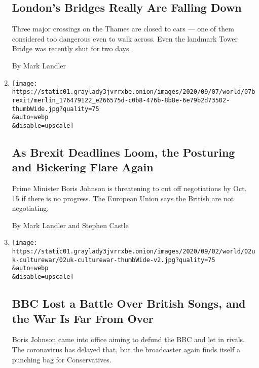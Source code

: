 \begin{enumerate}
  \hypertarget{londons-bridges-really-are-falling-down}{%
  \subsection{London's Bridges Really Are Falling
  Down}\label{londons-bridges-really-are-falling-down}}

  Three major crossings on the Thames are closed to cars --- one of them
  considered too dangerous even to walk across. Even the landmark Tower
  Bridge was recently shut for two days.

  By Mark Landler
\item
  \href{/2020/09/07/world/europe/brexit-boris-johnson.html}{}

  \texttt{[image: https://static01.graylady3jvrrxbe.onion/images/2020/09/07/world/07brexit/merlin\_176479122\_e266575d-c0b8-476b-8b8e-6e79b2d73502-thumbWide.jpg?quality=75\\\&auto=webp\\\&disable=upscale]}

  \hypertarget{as-brexit-deadlines-loom-the-posturing-and-bickering-flare-again}{%
  \subsection{As Brexit Deadlines Loom, the Posturing and Bickering
  Flare
  Again}\label{as-brexit-deadlines-loom-the-posturing-and-bickering-flare-again}}

  Prime Minister Boris Johnson is threatening to cut off negotiations by
  Oct. 15 if there is no progress. The European Union says the British
  are not negotiating.

  By Mark Landler and Stephen Castle
\item
  \href{/2020/09/02/world/europe/bbc-proms-johnson.html}{}

  \texttt{[image: https://static01.graylady3jvrrxbe.onion/images/2020/09/02/world/02uk-culturewar/02uk-culturewar-thumbWide-v2.jpg?quality=75\\\&auto=webp\\\&disable=upscale]}

  \hypertarget{bbc-lost-a-battle-over-british-songs-and-the-war-is-far-from-over}{%
  \subsection{BBC Lost a Battle Over British Songs, and the War Is Far
  From
  Over}\label{bbc-lost-a-battle-over-british-songs-and-the-war-is-far-from-over}}

  Boris Johnson came into office aiming to defund the BBC and let in
  rivals. The coronavirus has delayed that, but the broadcaster again
  finds itself a punching bag for Conservatives.


\end{enumerate}
